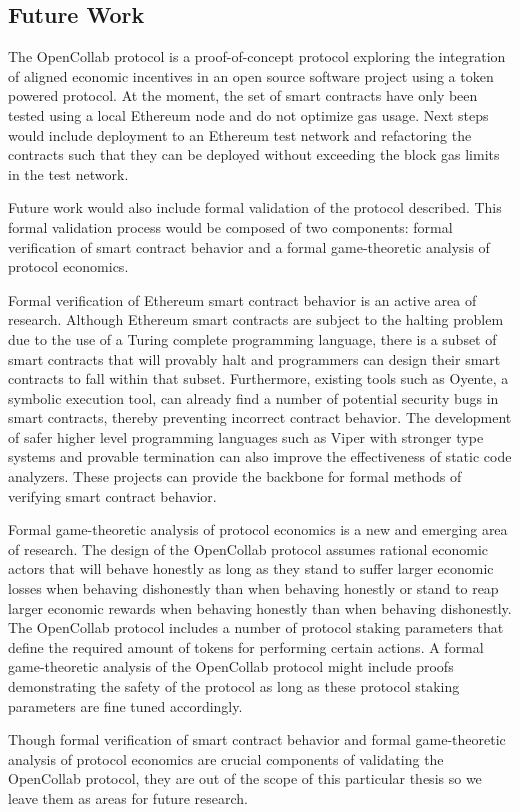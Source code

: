 \subsection{Future Work}

The OpenCollab protocol is a proof-of-concept protocol exploring the integration
of aligned economic incentives in an open source software project using a token
powered protocol. At the moment, the set of smart contracts have only been
tested using a local Ethereum node and do not optimize gas usage. Next steps
would include deployment to an Ethereum test network and refactoring the contracts such that they can be deployed without
exceeding the block gas limits in the test network.

Future work would also include formal validation of the protocol described. This
formal validation process would be composed of two components: formal
verification of smart contract behavior and a formal game-theoretic analysis of
protocol economics.

Formal verification of Ethereum smart contract behavior is an active area of
research. Although Ethereum smart contracts are subject to the halting problem
due to the use of a Turing complete programming language, there is a subset of
smart contracts that will provably halt and programmers can design their smart
contracts to fall within that subset\cite{halting}. Furthermore, existing tools such as
Oyente, a symbolic execution tool, can already find a number of potential
security bugs in smart contracts, thereby preventing incorrect contract behavior\cite{oyente}. The development of safer higher level
programming languages such as Viper with stronger type systems and provable
termination can also improve the effectiveness of static code
analyzers\cite{viper}. These projects can provide the
backbone for formal methods of verifying smart contract behavior.

Formal game-theoretic analysis of protocol economics is a new and emerging area
of research. The design of the OpenCollab protocol assumes rational economic
actors that will behave honestly as long as they stand to suffer larger economic
losses when behaving dishonestly than when behaving honestly or stand to reap
larger economic rewards when behaving honestly than when behaving dishonestly.
The OpenCollab protocol includes a number of protocol staking parameters that
define the required amount of tokens for performing certain actions. A formal
game-theoretic analysis of the OpenCollab protocol might include proofs
demonstrating the safety of the protocol as long as these protocol staking parameters
are fine tuned accordingly.

Though formal verification of smart contract behavior and formal game-theoretic
analysis of protocol economics are crucial components of validating the
OpenCollab protocol, they are out of the scope of this particular thesis so we
leave them as areas for future research.

